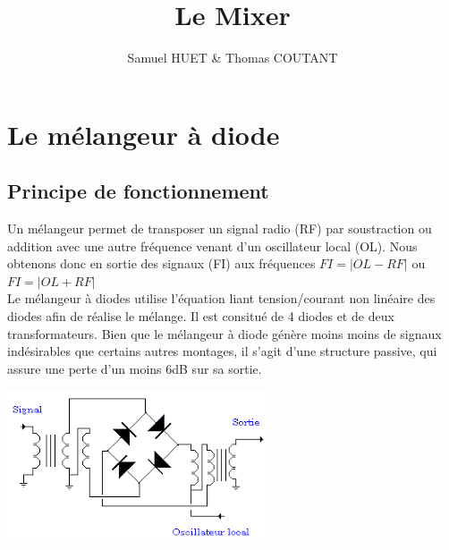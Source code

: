 \documentclass[a4paper,12pt]{report}            %
\author{Samuel HUET \& Thomas COUTANT}
\title{\huge{\textbf{Le Mixer}}}
\begin{document}
\maketitle
\renewcommand{\contentsname}{SOMMAIRE} %
\tableofcontents

\chapter{Le mélangeur à diode}

\section{Principe de fonctionnement}
    Un mélangeur permet de transposer un signal radio (RF) par soustraction ou addition avec
une autre fréquence venant d'un oscillateur local (OL). Nous obtenons donc en sortie des
signaux (FI) aux fréquences $FI = |OL - RF|$ ou $FI = |OL + RF|$\\
    Le mélangeur à diodes utilise l'équation liant tension/courant non linéaire
des diodes afin de réalise le mélange. Il est consitué de 4 diodes et de deux transformateurs.
Bien que le mélangeur à diode génère moins moins de signaux indésirables que certains autres montages,
il s'agit d'une structure passive, qui assure une perte d'un moins 6dB sur sa sortie.\\
\begin{center}\includegraphics[scale = 1]{pic/schema_mixer.png}\\ \end{center}
\end{document}
